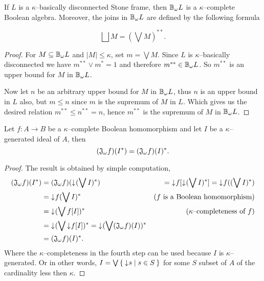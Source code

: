 \begin{lemma}\label{p:kappaComplStoneFrm}
    If $L$ is a $\kappa$--basically disconnected Stone frame, then $\mathbb{B}_{\omega} L$ is a $\kappa$--complete Boolean algebra. Moreover, the joins in $\mathbb{B}_{\omega} L$ are defined by the following formula

    $$\bigsqcup M = (\bigvee M)^{**}.$$
\end{lemma}
\begin{proof}
    For $M \subseteq \mathbb{B}_{\omega} L$ and $|M| \leq \kappa$, set $m = \bigvee M$. Since $L$ is $\kappa$--basically disconnected we have $m^{**} \vee m^* = 1$ and therefore $m^{**} \in \mathbb{B}_{\omega} L$. So $m^{**}$ is an upper bound for $M$ in $\mathbb{B}_{\omega} L$.

    Now let $n$ be an arbitrary upper bound for $M$ in $\mathbb{B}_{\omega} L$, thus $n$ is an upper bound in $L$ also, but $m \leq n$ since $m$ is the supremum of $M$ in $L$. Which gives us the desired relation $m^{**} \leq n^{**} = n$, hence $m^{**}$ is the supremum of $M$ in $\mathbb{B}_{\omega} L$.
\end{proof}

\begin{observation}
    Let $f\colon A \to B$ be a $\kappa$--complete Boolean homomorphism and let $I$ be a $\kappa$--generated ideal of $A$, then
    $$(\mathfrak{J}_{\omega} f)(I^*) = (\mathfrak{J}_{\omega} f)(I)^*.$$
\end{observation}
\begin{proof}
    The result is obtained by simple computation,
    \begin{align*}
        (\mathfrak{J}_{\omega} f)(I^*) &= (\mathfrak{J}_{\omega} f)(\mathord{\downarrow}\mkern1mu (\bigvee I)^*)
                &= \mathord{\downarrow}\mkern1mu f[\mathord{\downarrow}\mkern1mu (\bigvee I)^*] = \mathord{\downarrow}\mkern1mu f((\bigvee I)^*) \\
                &= \mathord{\downarrow}\mkern1mu f(\bigvee I)^* & \text{($f$ is a Boolean homomorphism)} \\
                &= \mathord{\downarrow}\mkern1mu (\bigvee f[I])^* & \text{($\kappa$--completeness of $f$)} \\
                &= \mathord{\downarrow}\mkern1mu (\bigvee \mathord{\downarrow}\mkern1mu f[I])^* = \mathord{\downarrow}\mkern1mu (\bigvee (\mathfrak{J}_{\omega} f)(I))^* \\
                &= (\mathfrak{J}_{\omega} f)(I)^*.
    \end{align*}
    Where the $\kappa$--completeness in the fourth step can be used because $I$ is $\kappa$--generated. Or in other words, $I = \bigvee \Set{ \mathord{\downarrow}\mkern1mus | s \in S }$ for some $S$ subset of $A$ of the cardinality less then $\kappa$.
\end{proof}


